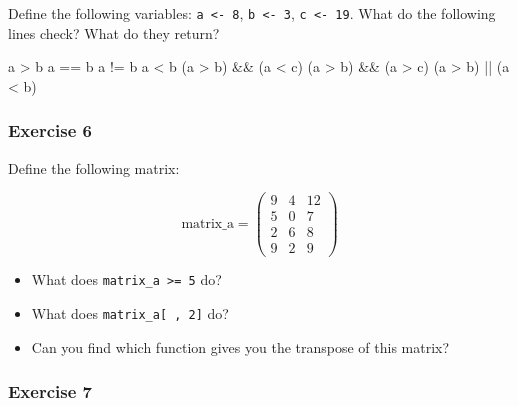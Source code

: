 \documentclass[
]{article}
\newenvironment{Shaded}{\begin{snugshade}}{\end{snugshade}}
\newcommand{\NormalTok}[1]{#1}
\newcommand{\SpecialCharTok}[1]{\textcolor[rgb]{0.00,0.00,0.00}{#1}}
\providecommand{\tightlist}{%
  \setlength{\itemsep}{0pt}\setlength{\parskip}{0pt}}
\begin{document}
Define the following variables: \texttt{a\ \textless{}-\ 8}, \texttt{b\ \textless{}-\ 3}, \texttt{c\ \textless{}-\ 19}. What do the following lines check?
What do they return?

\begin{Shaded}
\begin{Highlighting}[]
\NormalTok{a }\SpecialCharTok{\textgreater{}}\NormalTok{ b}
\NormalTok{a }\SpecialCharTok{==}\NormalTok{ b}
\NormalTok{a }\SpecialCharTok{!=}\NormalTok{ b}
\NormalTok{a }\SpecialCharTok{\textless{}}\NormalTok{ b}
\NormalTok{(a }\SpecialCharTok{\textgreater{}}\NormalTok{ b) }\SpecialCharTok{\&\&}\NormalTok{ (a }\SpecialCharTok{\textless{}}\NormalTok{ c)}
\NormalTok{(a }\SpecialCharTok{\textgreater{}}\NormalTok{ b) }\SpecialCharTok{\&\&}\NormalTok{ (a }\SpecialCharTok{\textgreater{}}\NormalTok{ c)}
\NormalTok{(a }\SpecialCharTok{\textgreater{}}\NormalTok{ b) }\SpecialCharTok{||}\NormalTok{ (a }\SpecialCharTok{\textless{}}\NormalTok{ b)}
\end{Highlighting}
\end{Shaded}

\hypertarget{exercise-6}{%
\subsubsection*{Exercise 6}\label{exercise-6}}

Define the following matrix:

\[
\text{matrix_a} = \left(
\begin{array}{ccc}
 9 & 4 & 12 \\
 5 & 0 & 7 \\
 2 & 6 & 8 \\
 9 & 2 & 9
\end{array} \right)
\]

\begin{itemize}
\tightlist
\item
  What does \texttt{matrix\_a\ \textgreater{}=\ 5} do?
\item
  What does \texttt{matrix\_a{[}\ ,\ 2{]}} do?
\item
  Can you find which function gives you the transpose of this matrix?
\end{itemize}

\hypertarget{exercise-7}{%
\subsubsection*{Exercise 7}\label{exercise-7}}
\end{document}
